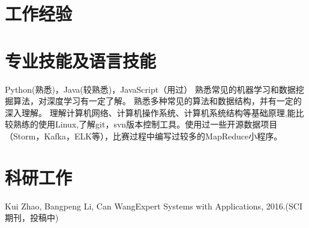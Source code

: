 \documentclass[10pt,a4paper,sans] {moderncv}   %
\begin{document}
\begin{CJK*}{UTF8}{gbsn}
\section{工作经验}

\section {专业技能及语言技能}
 {Python(熟悉)，Java(较熟悉)，JavaScript（用过）}
 {熟悉常见的机器学习和数据挖掘算法，对深度学习有一定了解。}
 {熟悉多种常见的算法和数据结构，并有一定的深入理解。}
 {理解计算机网络、计算机操作系统、计算机系统结构等基础原理,能比较熟练的使用Linux,了解git，svn版本控制工具。使用过一些开源数据项目（Storm，Kafka，ELK等），比赛过程中编写过较多的MapReduce小程序。}

\section {科研工作}
 {\newline Kui Zhao, Bangpeng Li, Can Wang}{}{}{{Expert Systems with Applications, 2016.(SCI期刊，投稿中)}}
\end{CJK*}
\end{document}
